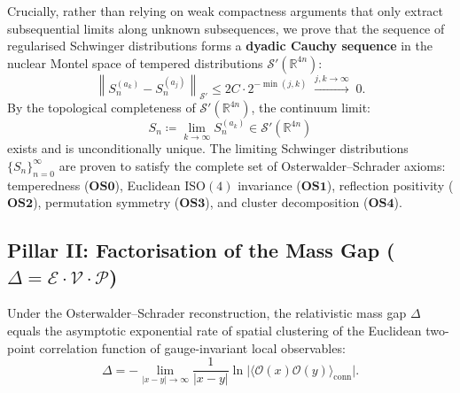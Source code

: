 Crucially, rather than relying on weak compactness arguments that only extract subsequential limits along unknown subsequences, we prove that the sequence of regularised Schwinger distributions forms a \textbf{dyadic Cauchy sequence} in the nuclear Montel space of tempered distributions $\mathcal{S}'(\mathbb{R}^{4n})$:
\begin{equation}
\label{eq:cauchy_schwinger_ch1}
\left\| S_n^{(a_k)} - S_n^{(a_j)} \right\|_{\mathcal{S}'} \le 2C \cdot 2^{-\min(j, k)} \;\xrightarrow{j,k \to \infty}\; 0.
\end{equation}
By the topological completeness of $\mathcal{S}'(\mathbb{R}^{4n})$, the continuum limit:
\begin{equation}
S_n \coloneqq \lim_{k \to \infty} S_n^{(a_k)} \in \mathcal{S}'(\mathbb{R}^{4n})
\end{equation}
exists and is unconditionally unique. The limiting Schwinger distributions $\{S_n\}_{n=0}^\infty$ are proven to satisfy the complete set of Osterwalder--Schrader axioms: temperedness ($\mathbf{OS0}$), Euclidean $\mathrm{ISO}(4)$ invariance ($\mathbf{OS1}$), reflection positivity ($\mathbf{OS2}$), permutation symmetry ($\mathbf{OS3}$), and cluster decomposition ($\mathbf{OS4}$).

\subsection{Pillar II: Factorisation of the Mass Gap ($\Delta = \mathcal{E} \cdot \mathcal{V} \cdot \mathcal{P}$)}
\label{subsec:pillar_II}
Under the Osterwalder--Schrader reconstruction, the relativistic mass gap $\Delta$ equals the asymptotic exponential rate of spatial clustering of the Euclidean two-point correlation function of gauge-invariant local observables:
\begin{equation}
\label{eq:intro_clustering_def}
\Delta = -\lim_{|x - y| \to \infty} \frac{1}{|x - y|} \ln \bigl| \langle \mathcal{O}(x) \mathcal{O}(y) \rangle_{\mathrm{conn}} \bigr|.
\end{equation}

